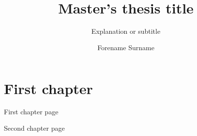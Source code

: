 \documentclass[noprint,nocopyright]{uit-thesis-test}
\begin{document}
\title{Master's thesis title}
\subtitle{Explanation or subtitle}
\author{Forename Surname}

\maketitle

\frontmatter

\tableofcontents

\mainmatter

\chapter{First chapter}

First chapter page

\newpage

Second chapter page
\end{document}
